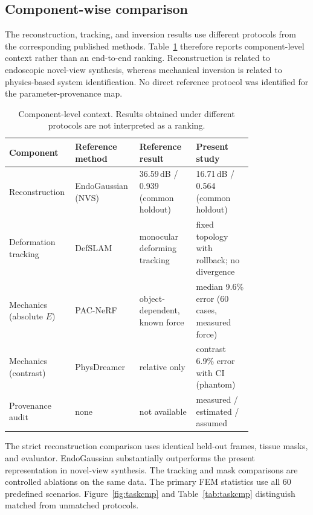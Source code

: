 \documentclass[pdflatex,lineno,referee,sn-vancouver,Numbered]{sn-jnl}
\begin{document}
\subsection{Component-wise comparison}
\label{sec:componentwise}
The reconstruction, tracking, and inversion results use different
protocols from the corresponding published methods. Table~\ref{tab:componentwise}
therefore reports component-level context rather than an end-to-end
ranking. Reconstruction is related to endoscopic novel-view synthesis,
whereas mechanical inversion is related to physics-based system
identification. No direct reference protocol was identified for the
parameter-provenance map.

\begin{table}[htbp]
\centering
\caption{Component-level context. Results obtained under different
protocols are not interpreted as a ranking.}
\label{tab:componentwise}
\footnotesize
\begin{tabular}{@{}p{0.14\linewidth}p{0.22\linewidth}p{0.22\linewidth}p{0.22\linewidth}@{}}
\toprule
Component & Reference method & Reference result & Present study \\
\midrule
Reconstruction & EndoGaussian \cite{endogaussian} (NVS) & 36.59\,dB / 0.939 (common holdout) & 16.71\,dB / 0.564 (common holdout) \\
Deformation tracking & DefSLAM \cite{defslam} & monocular deforming tracking & fixed topology with rollback; no divergence \\
Mechanics (absolute $E$) & PAC-NeRF \cite{pacnerf} & object-dependent, known force & median 9.6\% error (60 cases, measured force) \\
Mechanics (contrast) & PhysDreamer \cite{physdreamer} & relative only & contrast 6.9\% error with CI (phantom) \\
Provenance audit & none & not available & measured / estimated / assumed \\
\bottomrule
\end{tabular}
\end{table}

The strict reconstruction comparison uses identical held-out frames,
tissue masks, and evaluator. EndoGaussian substantially outperforms the
present representation in novel-view synthesis. The tracking and mask
comparisons are controlled ablations on the same data. The primary FEM
statistics use all 60 predefined scenarios. Figure~\ref{fig:taskcmp} and
Table~\ref{tab:taskcmp} distinguish matched from unmatched protocols.
\end{document}
